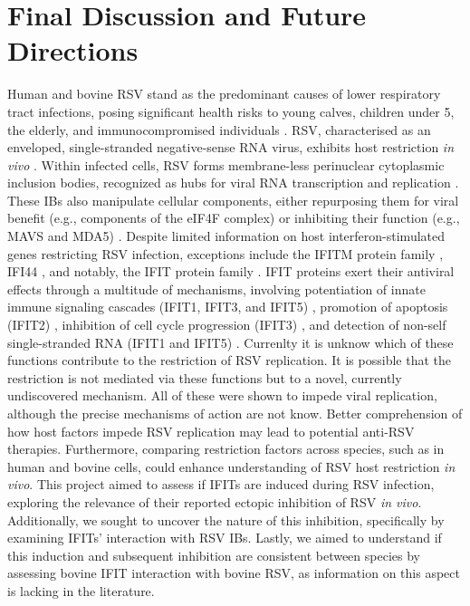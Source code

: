 \chapter{Final Discussion and Future Directions}
Human and bovine RSV stand as the predominant causes of lower respiratory tract infections, posing significant health risks to young calves, children under 5, the elderly, and immunocompromised individuals \cite{Falsey2005RespiratoryAdults, Coultas2019RespiratoryAge}. RSV, characterised as an enveloped, single-stranded negative-sense RNA virus, exhibits host restriction \textit{in vivo} \cite{Buchholz2000ChimericVaccine}. Within infected cells, RSV forms membrane-less perinuclear cytoplasmic inclusion bodies, recognized as hubs for viral RNA transcription and replication \cite{Rincheval2017FunctionalVirus, Jobe2020RespiratorySignaling, Jobe2023ViralCondensates}. These IBs also manipulate cellular components, either repurposing them for viral benefit (e.g., components of the eIF4F complex) \cite{Jobe2023ViralCondensates} or inhibiting their function (e.g., MAVS and MDA5) \cite{Lifland2012HumanMAVS}. Despite limited information on host interferon-stimulated genes restricting RSV infection, exceptions include the IFITM protein family \cite{Smith2019Interferon-InducedMembrane}, IFI44 \cite{McDonald2016ADisease, Li2021IdentificationVirus}, and notably, the IFIT protein family \cite{Drori2020InfluenzaProteins}. IFIT proteins exert their antiviral effects through a multitude of mechanisms, involving potentiation of innate immune signaling cascades (IFIT1, IFIT3, and IFIT5) \cite{Li2009ISG56Response, Reynaud2015IFIT1Interferon, Liu2011IFN-InducedTBK1, Zhang2013IFIT5Pathways}, promotion of apoptosis (IFIT2) \cite{Chen2017InhibitionApoptosis, Diamond2013TheProteins}, inhibition of cell cycle progression (IFIT3) \cite{Xiao2006RIG-GProteins}, and detection of non-self single-stranded RNA (IFIT1 and IFIT5) \cite{Abbas2013StructuralProteins, Pichlmair2011IFIT1RNA, Diamond2014IFIT1:Translation, Mears2018BetterResponse}. Currenlty it is unknow which of these functions contribute to the restriction of RSV replication. It is possible that the restriction is not mediated via these functions but to a novel, currently undiscovered mechanism. All of these were shown to impede viral replication, although the precise mechanisms of action are not know. Better comprehension of how host factors impede RSV replication may lead to potential anti-RSV therapies. Furthermore, comparing restriction factors across species, such as in human and bovine cells, could enhance understanding of RSV host restriction \textit{in vivo}. This project aimed to assess if IFITs are induced during RSV infection, exploring the relevance of their reported ectopic inhibition of RSV \textit{in vivo}. Additionally, we sought to uncover the nature of this inhibition, specifically by examining IFITs' interaction with RSV IBs. Lastly, we aimed to understand if this induction and subsequent inhibition are consistent between species by assessing bovine IFIT interaction with bovine RSV, as information on this aspect is lacking in the literature.

